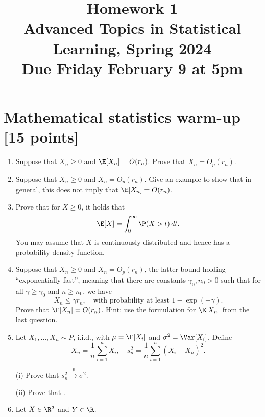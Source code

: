 \documentclass{article}
\title{Homework 1 \\ \smallskip
\large Advanced Topics in Statistical Learning, Spring 2024 \\ \smallskip
Due Friday February 9 at 5pm}
\date{}
\begin{document}
\maketitle
\RaggedRight
\vspace{-50pt}

\section{Mathematical statistics warm-up [15 points]}

\def\pto{\overset{p}{\to}}
\def\dto{\overset{d}{\to}}

\begin{enumerate}[label=(\alph*)]
\item Suppose that $X_n \geq 0$ and $\E[X_n]=O(r_n)$. Prove that $X_n=O_p(r_n)$.
  \marginpar{\small [1 pt]} 

\item Suppose that $X_n \geq 0$ and $X_n=O_p(r_n)$.  Give an example to show
  that in general, this does not  imply that $\E[X_n]=O(r_n)$.   
  \marginpar{\small [1 pt]} 

\item Prove that for $X \geq 0$, it holds that 
  \[
  \E[X] = \int_0^\infty \P(X>t) \, dt.
  \]  
  You may assume that $X$ is continuously distributed and hence has a probability
  density function. 
  \marginpar{\small [2 pts]} 

\item Suppose that $X_n \geq 0$ and $X_n=O_p(r_n)$, the latter bound holding
  ``exponentially fast'', meaning that there are constants $\gamma_0,n_0>0$ such 
  that for all $\gamma \geq \gamma_0$ and $n \geq n_0$, we have    
  \[
  X_n \leq \gamma r_n, \quad \text{with probability at least $1-\exp(-\gamma)$}.    
  \]
  Prove that $\E[X_n]=O(r_n)$. Hint: use the formulation for $\E[X_n]$ from the
  last question. 
  \marginpar{\small [3 pts]} 

\item Let $X_1,\ldots, X_n \sim P$, i.i.d., with $\mu = \E[X_i]$ and $\sigma^2 = 
  \Var[X_i]$. Define   
  \[
  \bar{X}_n = \frac{1}{n}\sum_{i=1}^n X_i, \quad
  s_n^2 = \frac{1}{n}\sum_{i=1}^n (X_i - \bar{X}_n)^2.
  \]

(i) Prove that $s_n^2 \pto \sigma^2$.
\marginpar{\small [1 pt]} 

(ii) Prove that \smash{$\sqrt{n}(\bar{X}_n-\mu)/s_n \dto N(0,1)$}.
\marginpar{\small [1 pt]} 

\item Let $X  \in \R^d$ and $Y \in \R$.


\end{enumerate}
\end{document}
